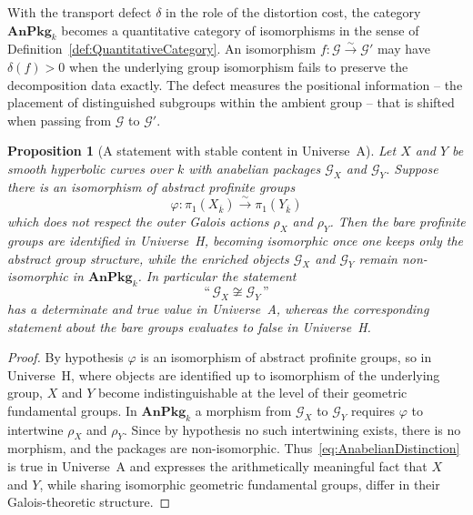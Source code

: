 \documentclass[10pt, reqno]{amsart}
\theoremstyle{plain}
\newtheorem{proposition}[theorem]{Proposition}
\theoremstyle{definition}
\theoremstyle{plain}
\begin{document}
With the transport defect $\delta$ in the role of the distortion cost, the category $\mathbf{AnPkg}_k$ becomes a quantitative category of isomorphisms in the sense of Definition~\ref{def:QuantitativeCategory}. An isomorphism $f \colon \mathcal{G} \xrightarrow{\sim} \mathcal{G}'$ may have $\delta(f) > 0$ when the underlying group isomorphism fails to preserve the decomposition data exactly. The defect measures the positional information -- the placement of distinguished subgroups within the ambient group -- that is shifted when passing from $\mathcal{G}$ to $\mathcal{G}'$.

\begin{proposition}[A statement with stable content in Universe~A]\label{prop:OrdinaryInA}
Let $X$ and $Y$ be smooth hyperbolic curves over $k$ with anabelian packages $\mathcal{G}_X$ and $\mathcal{G}_Y$. Suppose there is an isomorphism of abstract profinite groups
\[
  \varphi \colon \pi_1(X_{\overline{k}}) \xrightarrow{\sim} \pi_1(Y_{\overline{k}})
\]
which does not respect the outer Galois actions $\rho_X$ and $\rho_Y$. Then the bare profinite groups are identified in Universe~H, becoming isomorphic once one keeps only the abstract group structure, while the enriched objects $\mathcal{G}_X$ and $\mathcal{G}_Y$ remain non-isomorphic in $\mathbf{AnPkg}_k$. In particular the statement
\begin{equation}\label{eq:AnabelianDistinction}
  \text{``}\,\mathcal{G}_X \not\cong \mathcal{G}_Y\,\text{''}
\end{equation}
has a determinate and true value in Universe~A, whereas the corresponding statement about the bare groups evaluates to false in Universe~H.
\end{proposition}

\begin{proof}
By hypothesis $\varphi$ is an isomorphism of abstract profinite groups, so in Universe~H, where objects are identified up to isomorphism of the underlying group, $X$ and $Y$ become indistinguishable at the level of their geometric fundamental groups. In $\mathbf{AnPkg}_k$ a morphism from $\mathcal{G}_X$ to $\mathcal{G}_Y$ requires $\varphi$ to intertwine $\rho_X$ and $\rho_Y$. Since by hypothesis no such intertwining exists, there is no morphism, and the packages are non-isomorphic. Thus~\eqref{eq:AnabelianDistinction} is true in Universe~A and expresses the arithmetically meaningful fact that $X$ and $Y$, while sharing isomorphic geometric fundamental groups, differ in their Galois-theoretic structure.
\end{proof}
\end{document}
